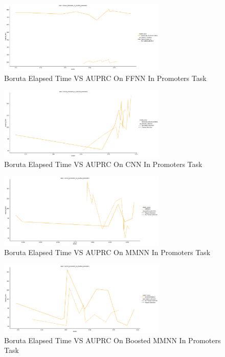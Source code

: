 \documentclass{article}
\begin{document}
\begin{enumerate}
    \begin{figure}[!ht]
        \centering
        \includegraphics[width=8cm]{image/boruta/promoters/BinaryClassificationFFNNV1.PNG}
        \caption{Boruta Elapsed Time VS AUPRC On FFNN In Promoters Task}
        \label{fig:Boruta_promoters_BinaryClassificationFFNNV1}
    \end{figure}
    \begin{figure}[!ht]
        \centering
        \includegraphics[width=8cm]{image/boruta/promoters/BinaryClassificationCNNV1.PNG}
        \caption{Boruta Elapsed Time VS AUPRC On CNN In Promoters Task}
        \label{fig:Boruta_promoters_BinaryClassificationCNNV1}
    \end{figure}
    \begin{figure}[!ht]
        \centering
        \includegraphics[width=8cm]{image/boruta/promoters/MMNNV1.PNG}
        \caption{Boruta Elapsed Time VS AUPRC On MMNN In Promoters Task}
        \label{fig:Boruta_promoters_MMNNV1}
    \end{figure}
    \begin{figure}[!ht]
        \centering
        \includegraphics[width=8cm]{image/boruta/promoters/BoostedMMNNV1.PNG}
        \caption{Boruta Elapsed Time VS AUPRC On Boosted MMNN In Promoters Task}
        \label{fig:Boruta_promoters_BoostedMMNNV1}
    \end{figure}
\end{enumerate}
\end{document}
